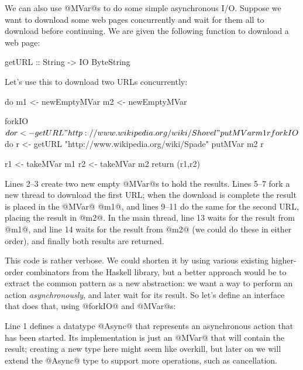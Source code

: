 We can also use @MVar@s to do some simple asynchronous I/O.  Suppose
we want to download some web pages concurrently and wait for them all
to download before continuing.  We are given the following function to
download a web page:

\begin{haskell}
getURL :: String -> IO ByteString
\end{haskell}

\noindent Let's use this to download two URLs concurrently:

\begin{numhaskell}
do
   m1 <- newEmptyMVar
   m2 <- newEmptyMVar

   forkIO $ do
     r <- getURL "http://www.wikipedia.org/wiki/Shovel"
     putMVar m1 r

   forkIO $ do
     r <- getURL "http://www.wikipedia.org/wiki/Spade"
     putMVar m2 r

   r1 <- takeMVar m1
   r2 <- takeMVar m2
   return (r1,r2)
\end{numhaskell}

\noindent Lines 2--3 create two new empty @MVar@s to hold the
results.  Lines 5--7 fork a new thread to download the first URL; when
the download is complete the result is placed in the @MVar@ @m1@, and
lines 9--11 do the same for the second URL, placing the result in @m2@.
In the main thread, line 13 waits for the result from @m1@, and line 14
waits for the result from @m2@ (we could do these in either order), and
finally both results are returned.

This code is rather verbose.  We could shorten it by using various
existing higher-order combinators from the Haskell library, but a
better approach would be to extract the common pattern as a new
abstraction: we want a way to perform an action \emph{asynchronously},
and later wait for its result.  So let's define an interface that does
that, using @forkIO@ and @MVar@s:


\noindent Line 1 defines a datatype @Async@ that represents an
asynchronous action that has been started.  Its implementation is just
an @MVar@ that will contain the result; creating a new type here might
seem like overkill, but later on we will extend the @Async@ type to
support more operations, such as cancellation.

